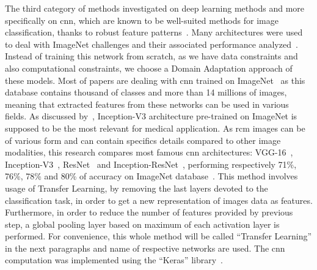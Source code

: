 \documentclass[journal,article,submit,moreauthors,pdftex, applsci]{Definitions/mdpi}
\begin{document}
The third category of methods investigated on deep learning methods and more specifically on \ac{cnn}, which are known to be well-suited methods for image classification, thanks to robust feature patterns~\cite{Pathan2018}. Many architectures were used to deal with ImageNet challenges and their associated performance analyzed~\cite{Canziani2016}. Instead of training this network from scratch, as we have data constraints and also computational constraints, we choose a Domain Adaptation approach of these models. Most of papers are dealing with \ac{cnn} trained on ImageNet~\cite{Deng2008} as this database contains thousand of classes and more than 14 millions of images, meaning that extracted features from these networks can be used in various fields. As discussed by~\cite{Litjens2017}, Inception-V3 architecture pre-trained on ImageNet is supposed to be the most relevant for medical application. As \ac{rcm} images can be of various form and can contain specifics details compared to other image modalities, this research compares most famous \ac{cnn} architectures: VGG-16~\cite{Simonyan2014}, Inception-V3~\cite{Szegedy2015}, ResNet~\cite{He2016} and Inception-ResNet~\cite{Szegedy2017}, performing respectively 71\%, 76\%, 78\% and 80\% of accuracy on ImageNet database~\cite{Canziani2016}. This method involves usage of Transfer Learning, by removing the last layers devoted to the classification task, in order to get a new representation of images data as features. Furthermore, in order to reduce the number of features provided by previous step, a global pooling layer based on maximum of each activation layer is performed. For convenience, this whole method will be called “Transfer Learning” in the next paragraphs and name of respective networks are used. The \ac{cnn} computation was implemented using the “Keras” library~\cite{chollet2015keras}.\par

\end{document}
